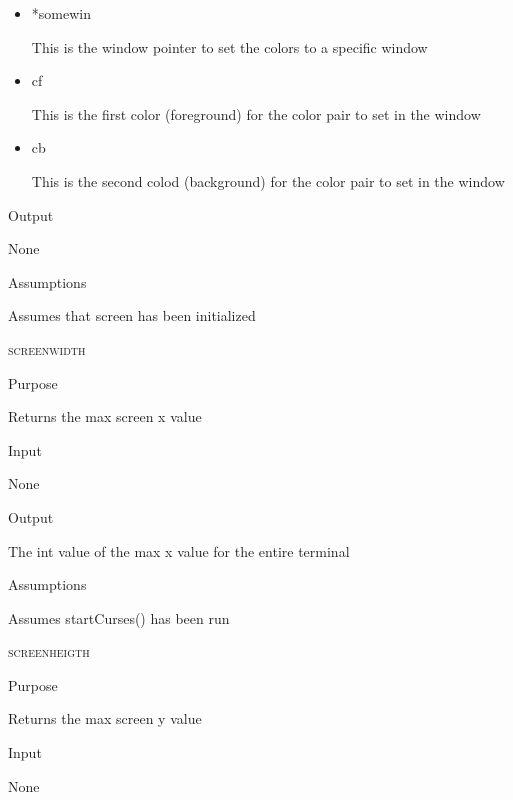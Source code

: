 \documentclass[pdftex, 11pt]{article}
\begin{document}
\begin{description}
\begin{description}
\begin{itemize}
					\item{*somewin}

						This is the window pointer to set
						the colors to a specific window

					\item{cf}

						This is the first color (foreground)
						for the color pair to set in the window

					\item{cb}

						This is the second colod (background)
						for the color pair to set in the window
						
				\end{itemize}	

			\item{Output}

				None

			\item{Assumptions}

				Assumes that screen has been initialized

		\end{description}


	\item{\textsc{screenwidth}}
		\begin{description}
			\item{Purpose}

				Returns the max screen x value 

			\item{Input}

				None

			\item{Output}

				The int value of the max x value for the entire terminal

			\item{Assumptions}

				Assumes startCurses() has been run

		\end{description}


	\item{\textsc{screenheigth}}
		\begin{description}
			\item{Purpose}

				Returns the max screen y value

			\item{Input}

				None


\end{description}
\end{description}
\end{document}
